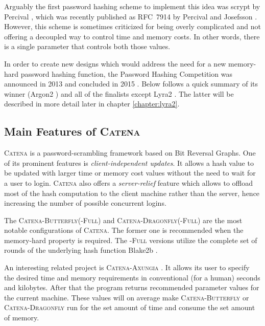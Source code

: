 Arguably the first password hashing scheme to implement this idea was scrypt by Percival \cite{percival:2016:scrypt}, which was recently published as \mbox{RFC 7914} by Percival and Josefsson \cite{rfc7914}. However, this scheme is sometimes criticized for being overly complicated and not offering a decoupled way to control time and memory costs. In other words, there is a single parameter that controls both those values.

In order to create new designs which would address the need for a new memory-hard password hashing function, the Password Hashing Competition was announced in 2013 and concluded in 2015 \cite{wetzels:2016:phc}. Below follows a quick summary of its winner (Argon2 \cite{biryukov:2015:argon2}) and all of the finalists except Lyra2 \cite{andrade:2016:lyra2}. The latter will be described in more detail later in chapter \ref{chapter:lyra2}.

\subsection{Main Features of \textsc{Catena}}
\label{sec:catena}

\textsc{Catena} \cite{forler:2013:catena} is a password-scrambling framework based on Bit Reversal Graphs. One of its prominent features is \emph{client-independent updates}. It allows a hash value to be updated with larger time or memory cost values without the need to wait for a user to login. \textsc{Catena} also offers a \emph{server-relief} feature which allows to offload most of the hash computation to the client machine rather than the server, hence increasing the number of possible concurrent logins.

The \textsc{Catena-Butterfly(-Full)} and \textsc{Catena-Dragonfly(-Full)} are the most notable configurations of \textsc{Catena}. The former one is recommended when the memory-hard property is required. The \textsc{-Full} versions utilize the complete set of rounds of the underlying hash function Blake2b \cite{aumasson:2013:blake2}.

An interesting related project is \textsc{Catena-Axungia} \cite{github:2017:catena-axungia}. It allows its user to specify the desired time and memory requirements in conventional (for a human) seconds and kilobytes. After that the program returns recommended parameter values for the current machine. These values will on average make \textsc{Catena-Butterfly} or \textsc{Catena-Dragonfly} run for the set amount of time and consume the set amount of memory.

